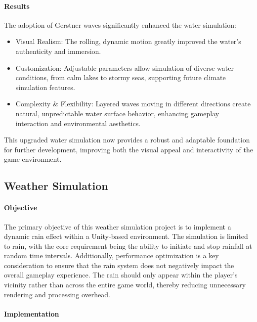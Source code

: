 \documentclass{article}
\begin{document}
\paragraph{Results}\hfill

The adoption of Gerstner waves significantly enhanced the water simulation:
\begin{itemize}
    \item Visual Realism: The rolling, dynamic motion greatly improved the water's authenticity and immersion.
    \item Customization: Adjustable parameters allow simulation of diverse water conditions, from calm lakes to stormy seas, supporting future climate simulation features.
    \item Complexity \& Flexibility: Layered waves moving in different directions create natural, unpredictable water surface behavior, enhancing gameplay interaction and environmental aesthetics.
\end{itemize}

This upgraded water simulation now provides a robust and adaptable foundation for further development, improving both the visual appeal and interactivity of the game environment.










\newpage
\subsection{Weather Simulation}
\paragraph{Objective}\hfill

The primary objective of this weather simulation project is to implement a dynamic rain effect within a Unity-based environment. The simulation is limited to rain, with the core requirement being the ability to initiate and stop rainfall at random time intervals. Additionally, performance optimization is a key consideration to ensure that the rain system does not negatively impact the overall gameplay experience. The rain should only appear within the player's vicinity rather than across the entire game world, thereby reducing unnecessary rendering and processing overhead.

\paragraph{Implementation}\hfill
\end{document}
